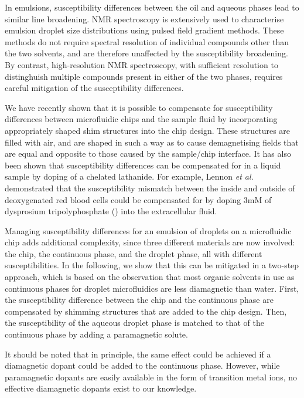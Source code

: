 In emulsions, susceptibility differences between the oil and aqueous phases
lead to similar line broadening.\cite{Kuchel:2003ip} NMR spectroscopy is extensively
used to characterise emulsion droplet size distributions using pulsed
field gradient methods.\cite{VANDENENDEN:1990ck,FOUREL:1994jv,
Hollingsworth:2004iy,Hindmarsh:2005en,Johns:2009ib,Bernewitz:2011km,Lingwood:2012je}
These methods do not require spectral resolution of individual
compounds other than the two solvents, and are therefore
unaffected by the susceptibility broadening. By contrast, high-resolution
NMR spectroscopy, with sufficient resolution to distinghuish multiple
compounds present in either of the two phases,
requires careful mitigation of the susceptibility differences.


We have recently shown that it is possible to compensate for
susceptibility differences between microfluidic chips and the sample
fluid by incorporating appropriately shaped shim structures
into the chip design.\cite{Ryan:2014hl} These structures are filled with air,
and are shaped in such a way as to cause demagnetising fields
that are equal and opposite to those caused by the sample/chip interface.
It has also been shown that susceptibility differences can be compensated for in a liquid sample by doping of a chelated lathanide.\cite{fabry1983effect}
For example, Lennon \emph{et al.} demonstrated that the susceptibility mismatch between the inside and outside of deoxygenated red blood cells could be
compensated for by doping 3mM of dysprosium tripolyphosphate () into the extracellular fluid.\cite{lennon1994hemoglobin}

Managing susceptibility differences for an emulsion of droplets on a
microfluidic chip adds additional complexity, since three different materials
are now involved: the chip, the continuous phase, and the droplet phase,
all with different susceptibilities.
In the following, we show that this can be mitigated in a two-step approach,
which is based on the observation that most organic solvents in use
as continuous phases for droplet microfluidics are less diamagnetic than
water.
First, the susceptibility difference between the chip and the continuous phase
are compensated by shimming structures that are added to the
chip design. Then, the susceptibility of the aqueous droplet phase is matched
to that of the continuous phase by adding a paramagnetic solute.

It should be noted that in principle, the same effect could be achieved if
a diamagnetic dopant could be added to the continuous phase. However, while paramagnetic
dopants are easily available in the form of transition metal ions, no
effective diamagnetic dopants exist to our knowledge.

